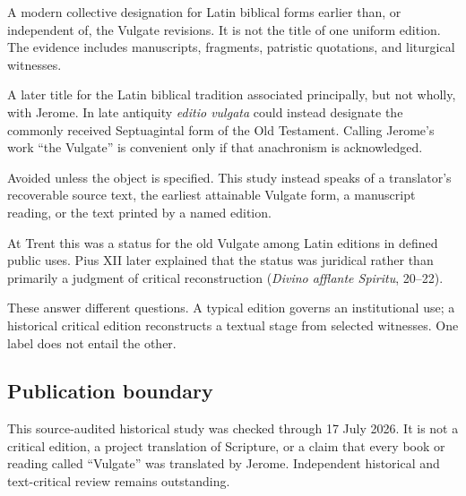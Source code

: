 \begin{description}[style=nextline]
\item[Old Latin or \emph{Vetus Latina}.] A modern collective designation for Latin biblical forms earlier than, or independent of, the Vulgate revisions. It is not the title of one uniform edition. The evidence includes manuscripts, fragments, patristic quotations, and liturgical witnesses.
\item[Vulgate.] A later title for the Latin biblical tradition associated principally, but not wholly, with Jerome. In late antiquity \emph{editio vulgata} could instead designate the commonly received Septuagintal form of the Old Testament. Calling Jerome's work ``the Vulgate'' is convenient only if that anachronism is acknowledged.
\item[Original text.] Avoided unless the object is specified. This study instead speaks of a translator's recoverable source text, the earliest attainable Vulgate form, a manuscript reading, or the text printed by a named edition.
\item[Authentic.] At Trent this was a status for the old Vulgate among Latin editions in defined public uses. Pius XII later explained that the status was juridical rather than primarily a judgment of critical reconstruction (\emph{Divino afflante Spiritu}, 20--22).
\item[Official and critical.] These answer different questions. A typical edition governs an institutional use; a historical critical edition reconstructs a textual stage from selected witnesses. One label does not entail the other.
\end{description}

\subsection{Publication boundary}

This source-audited historical study was checked through 17 July 2026. It is not a critical edition, a project translation of Scripture, or a claim that every book or reading called “Vulgate” was translated by Jerome. Independent historical and text-critical review remains outstanding.
